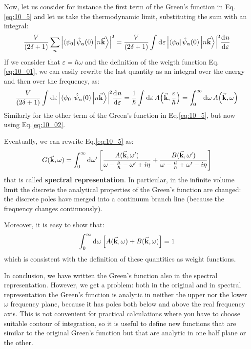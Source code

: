 \documentclass[../main/main.tex]{subfiles}
\begin{document}
Now, let us consider for instance the first term of the Green's function in Eq.\eqref{eq:10_5} and let us take the thermodynamic limit, substituting the sum with an integral:
\begin{equation*}
  \frac{V}{(2 \delta +1)} \sum_{n}^{}  \abs{\bra{\psi _0} \hat{\psi }_ \alpha
   (0) \ket{ n \va{k}}}^2
   = \frac{V}{(2 \delta +1)} \int_{}^{} \dd[]{\varepsilon }\abs{\bra{\psi _0} \hat{\psi }_ \alpha
    (0) \ket{ n \va{k}}}^2 \frac{\dd[]{n} }{\dd[]{\varepsilon } }
\end{equation*}
If we consider that \( \varepsilon = \hbar \omega  \) and the definition of the weigth function Eq.\eqref{eq:10_01}, we can easily rewrite the last quantity as an integral over the energy and then over the frequency, as:
\begin{equation*}
  \frac{V}{(2 \delta +1)} \int_{}^{} \dd[]{\varepsilon }\abs{\bra{\psi _0} \hat{\psi }_ \alpha
   (0) \ket{ n \va{k}}}^2 \frac{\dd[]{n} }{\dd[]{\varepsilon } }
   = \frac{1}{\hbar } \int_{}^{} \dd[]{\varepsilon } A \qty(\va{k}, \frac{\varepsilon }{\hbar })
   = \int_{0}^{\infty } \dd[]{\omega } A \qty(\va{k}, \omega )
\end{equation*}
Similarly for the other term of the Green's function in Eq.\eqref{eq:10_5}, but now using  Eq.\eqref{eq:10_02}.

Eventually, we can rewrite Eq.\eqref{eq:10_5} as: 
\begin{equation}
  G(\va{k}, \omega ) = \int_{0}^{\infty } \dd[]{\omega'}
  \qty[ \frac{A(\va{k},\omega' )}{\omega - \frac{\mu }{\hbar } - \omega' + i \eta  }
  +
  \frac{B(\va{k},\omega' )}{\omega - \frac{\mu }{\hbar } + \omega' - i \eta  }]
  \label{eq:10_1}
\end{equation}
that is  called \textbf{spectral representation}. In particular, in the infinite volume limit the discrete the analytical properties of the Green's function are changed: the discrete poles have merged into a continuum branch line (because the frequency changes continuously).

Moreover, it is easy to show that:
\begin{equation}
  \int_{0}^{\infty } \dd[]{\omega } \qty[ A(\va{k}, \omega ) + B (\va{k}, \omega )] =1
  \label{eq:10_7}
\end{equation}
which is consistent with the definition of these quantities as weight functions.

In conclusion, we have written the Green's function also in the spectral representation. However, we get a problem: both in the original and in spectral representation the Green's function is analytic in neither the upper nor the lower \( \omega  \) frequency plane, because it has poles both below and above the real frequency axis.
This is not convenient for practical calculations where you have to choose suitable contour of integration, so it is useful to define new functions that are similar to the original Green's function but that are analytic in one half plane or the other.
\end{document}

